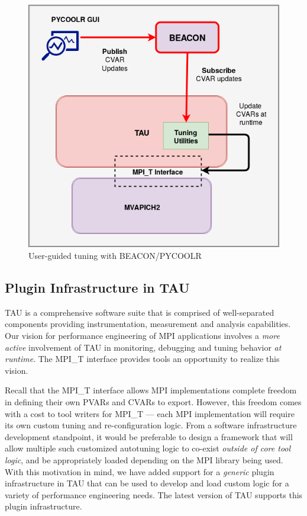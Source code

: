 \begin{center}
        \begin{figure}[tbp!]
        \centering
                \includegraphics[scale=0.4,keepaspectratio]{figures/Manual_Tuning_Design}
                \caption{User-guided tuning with BEACON/PYCOOLR}
                \label{fig:manualtuning}
        \end{figure}
\end{center}

\subsection{Plugin Infrastructure in TAU}

TAU is a comprehensive software suite that is comprised of well-separated components providing instrumentation, measurement and analysis capabilities. Our vision for performance engineering of MPI applications involves a \textit{more active} involvement of TAU in monitoring, debugging and tuning behavior \textit{at runtime}. The MPI\_T interface provides tools an opportunity to realize this vision.
\par Recall that the MPI\_T interface allows MPI implementations complete freedom in defining their own PVARs and CVARs to export. However, this freedom comes with a cost to tool writers for MPI\_T --- each MPI implementation will require its own custom tuning and re-configuration logic. From a software infrastructure development standpoint, it would be preferable to design a framework that will allow multiple such customized autotuning logic to co-exist \textit {outside of core tool logic}, and be appropriately loaded depending on the MPI library being used. With this motivation in mind, we have added support for a \textit{generic} plugin infrastructure in TAU that can be used to develop and load custom logic for a variety of performance engineering needs. The latest version of TAU supports this plugin infrastructure.

